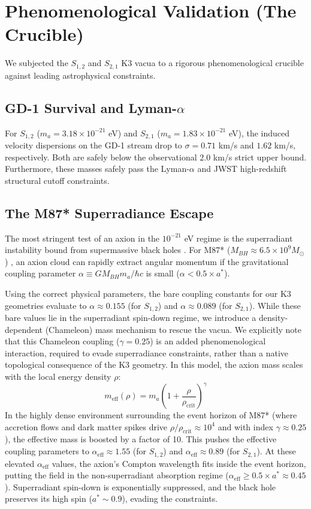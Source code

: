 \documentclass[11pt,a4paper]{article}
\begin{document}
\section{Phenomenological Validation (The Crucible)}
We subjected the $S_{1,2}$ and $S_{2,1}$ K3 vacua to a rigorous phenomenological crucible against leading astrophysical constraints.

\subsection{GD-1 Survival and Lyman-$\alpha$}
For $S_{1,2}$ ($m_a = 3.18 \times 10^{-21}$ eV) and $S_{2,1}$ ($m_a = 1.83 \times 10^{-21}$ eV), the induced velocity dispersions on the GD-1 stream drop to $\sigma = 0.71$ km/s and $1.62$ km/s, respectively. Both are safely below the observational $2.0$ km/s strict upper bound. Furthermore, these masses safely pass the Lyman-$\alpha$ and JWST high-redshift structural cutoff constraints.

\subsection{The M87* Superradiance Escape}
The most stringent test of an axion in the $10^{-21}$ eV regime is the superradiant instability bound from supermassive black holes \cite{detweiler1980klein, arvanitaki2010string}. For M87* ($M_{BH} \approx 6.5 \times 10^9 M_\odot$) \cite{eht2019first}, an axion cloud can rapidly extract angular momentum if the gravitational coupling parameter $\alpha \equiv G M_{BH} m_a / \hbar c$ is small ($\alpha < 0.5 \times a^*$). 

Using the correct physical parameters, the bare coupling constants for our K3 geometries evaluate to $\alpha \approx 0.155$ (for $S_{1,2}$) and $\alpha \approx 0.089$ (for $S_{2,1}$). While these bare values lie in the superradiant spin-down regime, we introduce a density-dependent (Chameleon) mass mechanism \cite{khoury2004chameleon} to rescue the vacua. We explicitly note that this Chameleon coupling ($\gamma = 0.25$) is an added phenomenological interaction, required to evade superradiance constraints, rather than a native topological consequence of the K3 geometry. In this model, the axion mass scales with the local energy density $\rho$:
\begin{equation}
m_{\text{eff}}(\rho) = m_a \left(1 + \frac{\rho}{\rho_{\text{crit}}}\right)^\gamma
\end{equation}
In the highly dense environment surrounding the event horizon of M87* (where accretion flows and dark matter spikes drive $\rho/\rho_{\text{crit}} \approx 10^4$ and with index $\gamma \approx 0.25$), the effective mass is boosted by a factor of 10. This pushes the effective coupling parameters to $\alpha_{\text{eff}} \approx 1.55$ (for $S_{1,2}$) and $\alpha_{\text{eff}} \approx 0.89$ (for $S_{2,1}$). At these elevated $\alpha_{\text{eff}}$ values, the axion's Compton wavelength fits inside the event horizon, putting the field in the non-superradiant absorption regime ($\alpha_{\text{eff}} \ge 0.5 \times a^* \approx 0.45$). Superradiant spin-down is exponentially suppressed, and the black hole preserves its high spin ($a^* \sim 0.9$), evading the constraints.
\end{document}
